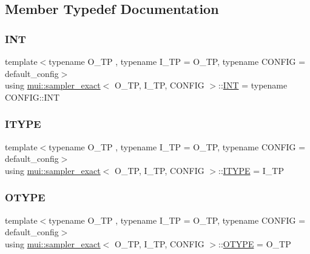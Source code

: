 \subsection{Member Typedef Documentation}
\mbox{\label{classmui_1_1sampler__exact_a94e324d5b0e9fb37c4dc011638d7a157}} 
\subsubsection{\texorpdfstring{I\+NT}{INT}}
{\footnotesize\ttfamily template$<$typename O\+\_\+\+TP , typename I\+\_\+\+TP  = O\+\_\+\+TP, typename C\+O\+N\+F\+IG  = default\+\_\+config$>$ \\
using \hyperlink{classmui_1_1sampler__exact}{mui\+::sampler\+\_\+exact}$<$ O\+\_\+\+TP, I\+\_\+\+TP, C\+O\+N\+F\+IG $>$\+::\hyperlink{classmui_1_1sampler__exact_a94e324d5b0e9fb37c4dc011638d7a157}{I\+NT} =  typename C\+O\+N\+F\+I\+G\+::\+I\+NT}

\mbox{\label{classmui_1_1sampler__exact_a4198aa2cc7c945895db91aae2b6cc0b2}} 
\subsubsection{\texorpdfstring{I\+T\+Y\+PE}{ITYPE}}
{\footnotesize\ttfamily template$<$typename O\+\_\+\+TP , typename I\+\_\+\+TP  = O\+\_\+\+TP, typename C\+O\+N\+F\+IG  = default\+\_\+config$>$ \\
using \hyperlink{classmui_1_1sampler__exact}{mui\+::sampler\+\_\+exact}$<$ O\+\_\+\+TP, I\+\_\+\+TP, C\+O\+N\+F\+IG $>$\+::\hyperlink{classmui_1_1sampler__exact_a4198aa2cc7c945895db91aae2b6cc0b2}{I\+T\+Y\+PE} =  I\+\_\+\+TP}

\mbox{\label{classmui_1_1sampler__exact_a7543e4be38b14fb93d07b34ee4e33f4d}} 
\subsubsection{\texorpdfstring{O\+T\+Y\+PE}{OTYPE}}
{\footnotesize\ttfamily template$<$typename O\+\_\+\+TP , typename I\+\_\+\+TP  = O\+\_\+\+TP, typename C\+O\+N\+F\+IG  = default\+\_\+config$>$ \\
using \hyperlink{classmui_1_1sampler__exact}{mui\+::sampler\+\_\+exact}$<$ O\+\_\+\+TP, I\+\_\+\+TP, C\+O\+N\+F\+IG $>$\+::\hyperlink{classmui_1_1sampler__exact_a7543e4be38b14fb93d07b34ee4e33f4d}{O\+T\+Y\+PE} =  O\+\_\+\+TP}

